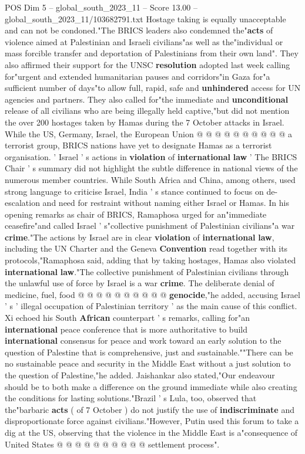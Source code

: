 \begin{textsample}{POS Dim 5 – global\_south\_2023\_11 – Score 13.00 – global\_south\_2023\_11/103682791.txt}
Hostage taking is equally unacceptable and can not be condoned."The BRICS leaders also condemned the"\textbf{acts} of violence aimed at Palestinian and Israeli civilians"as well as the"individual or mass forcible transfer and deportation of Palestinians from their own land".
They also affirmed their support for the UNSC \textbf{resolution} adopted last week calling for"urgent and extended humanitarian pauses and corridors"in Gaza for"a sufficient number of days"to allow full, rapid, safe and \textbf{unhindered} access for UN agencies and partners.
They also called for"the immediate and \textbf{unconditional} release of all civilians who are being illegally held captive,"but did not mention the over 200 hostages taken by Hamas during the 7 October attacks in Israel.
While the US, Germany, Israel, the European Union @ @ @ @ @ @ @ @ @ @ a terrorist group, BRICS nations have yet to designate Hamas as a terrorist organisation. ' Israel ' s actions in \textbf{violation} of \textbf{international} \textbf{law} ' The BRICS Chair ' s summary did not highlight the subtle difference in national views of the numerous member countries.
While South Africa and China, among others, used strong language to criticise Israel, India ' s stance continued to focus on de-escalation and need for restraint without naming either Israel or Hamas.
In his opening remarks as chair of BRICS, Ramaphosa urged for an"immediate ceasefire"and called Israel ' s"collective punishment of Palestinian civilians"a war \textbf{crime}."The actions by Israel are in clear \textbf{violation} of \textbf{international} \textbf{law}, including the UN Charter and the Geneva \textbf{Convention} read together with its protocols,"Ramaphosa said, adding that by taking hostages, Hamas also violated \textbf{international} \textbf{law}."The collective punishment of Palestinian civilians through the unlawful use of force by Israel is a war \textbf{crime}.
The deliberate denial of medicine, fuel, food @ @ @ @ @ @ @ @ @ @ \textbf{genocide},"he added, accusing Israel ' s ' illegal occupation of Palestinian territory ' as the main cause of this conflict.
Xi echoed his South \textbf{African} counterpart ' s remarks, calling for"an \textbf{international} peace conference that is more authoritative to build \textbf{international} consensus for peace and work toward an early solution to the question of Palestine that is comprehensive, just and sustainable.""There can be no sustainable peace and security in the Middle East without a just solution to the question of Palestine,"he added.
Jaishankar also stated,"Our endeavour should be to both make a difference on the ground immediate while also creating the conditions for lasting solutions."Brazil ' s Lula, too, observed that the"barbaric \textbf{acts} ( of 7 October ) do not justify the use of \textbf{indiscriminate} and disproportionate force against civilians."However, Putin used this forum to take a dig at the US, observing that the violence in the Middle East is a"consequence of United States @ @ @ @ @ @ @ @ @ @ settlement process".

\end{textsample}

